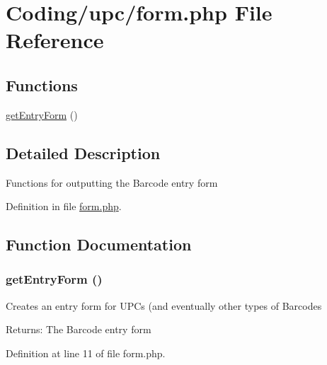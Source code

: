 \hypertarget{form_8php}{
\section{Coding/upc/form.php File Reference}
\label{form_8php}
}
\subsection*{Functions}
\begin{CompactItemize}
\item 
\hyperlink{form_8php_839e205cae656bea01ea99e2de94ef1e}{getEntryForm} ()
\end{CompactItemize}


\subsection{Detailed Description}
Functions for outputting the Barcode entry form 

Definition in file \hyperlink{form_8php-source}{form.php}.

\subsection{Function Documentation}
\hypertarget{form_8php_839e205cae656bea01ea99e2de94ef1e}{
\subsubsection{\setlength{\rightskip}{0pt plus 5cm}getEntryForm ()}}
\label{form_8php_839e205cae656bea01ea99e2de94ef1e}


Creates an entry form for UPCs (and eventually other types of Barcodes

\begin{Desc}
\item[Returns:]The Barcode entry form \end{Desc}


Definition at line 11 of file form.php.